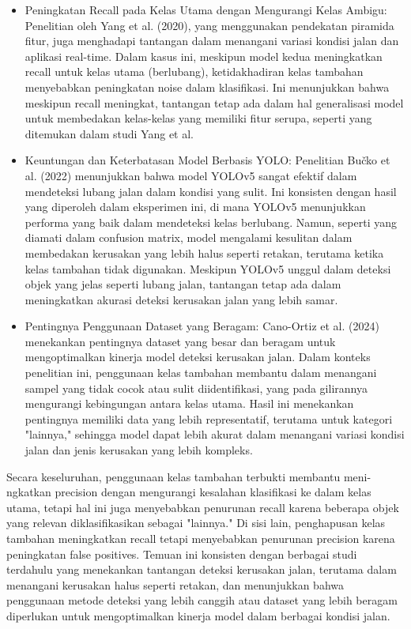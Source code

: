 \documentclass[12pt,a4paper]{article}
\begin{document}
\begin{adjustwidth}{3em}{0pt}
\begin{itemize}
    \item Peningkatan Recall pada Kelas Utama dengan Mengurangi Kelas Ambigu: Penelitian oleh Yang et al. (2020), yang menggunakan pendekatan piramida fitur, juga menghadapi tantangan dalam menangani variasi kondisi jalan dan aplikasi real-time. Dalam kasus ini, meskipun model kedua meningkatkan recall untuk kelas utama (berlubang), ketidakhadiran kelas tambahan menyebabkan peningkatan noise dalam klasifikasi. Ini menunjukkan bahwa meskipun recall meningkat, tantangan tetap ada dalam hal generalisasi model untuk membedakan kelas-kelas yang memiliki fitur serupa, seperti yang ditemukan dalam studi Yang et al.

    \item Keuntungan dan Keterbatasan Model Berbasis YOLO: Penelitian Bučko et al. (2022) menunjukkan bahwa model YOLOv5 sangat efektif dalam mendeteksi lubang jalan dalam kondisi yang sulit. Ini konsisten dengan hasil yang diperoleh dalam eksperimen ini, di mana YOLOv5 menunjukkan performa yang baik dalam mendeteksi kelas berlubang. Namun, seperti yang diamati dalam confusion matrix, model mengalami kesulitan dalam membedakan kerusakan yang lebih halus seperti retakan, terutama ketika kelas tambahan tidak digunakan. Meskipun YOLOv5 unggul dalam deteksi objek yang jelas seperti lubang jalan, tantangan tetap ada dalam meningkatkan akurasi deteksi kerusakan jalan yang lebih samar.

    \item Pentingnya Penggunaan Dataset yang Beragam: Cano-Ortiz et al. (2024) menekankan pentingnya dataset yang besar dan beragam untuk mengoptimalkan kinerja model deteksi kerusakan jalan. Dalam konteks penelitian ini, penggunaan kelas tambahan membantu dalam menangani sampel yang tidak cocok atau sulit diidentifikasi, yang pada gilirannya mengurangi kebingungan antara kelas utama. Hasil ini menekankan pentingnya memiliki data yang lebih representatif, terutama untuk kategori "lainnya," sehingga model dapat lebih akurat dalam menangani variasi kondisi jalan dan jenis kerusakan yang lebih kompleks. \end{itemize}

\hspace{0.5cm} Secara keseluruhan, penggunaan kelas tambahan terbukti membantu meni-ngkatkan precision dengan mengurangi kesalahan klasifikasi ke dalam kelas utama, tetapi hal ini juga menyebabkan penurunan recall karena beberapa objek yang relevan diklasifikasikan sebagai "lainnya." Di sisi lain, penghapusan kelas tambahan meningkatkan recall tetapi menyebabkan penurunan precision karena peningkatan false positives. Temuan ini konsisten dengan berbagai studi terdahulu yang menekankan tantangan deteksi kerusakan jalan, terutama dalam menangani kerusakan halus seperti retakan, dan menunjukkan bahwa penggunaan metode deteksi yang lebih canggih atau dataset yang lebih beragam diperlukan untuk mengoptimalkan kinerja model dalam berbagai kondisi jalan.

\end{adjustwidth}
\end{document}
